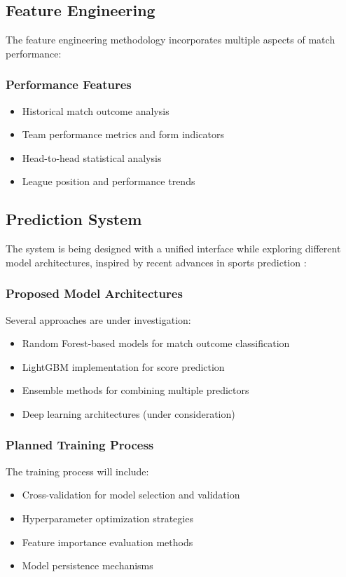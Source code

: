 \documentclass[conference]{IEEEtran}
\begin{document}
\subsection{Feature Engineering}
The feature engineering methodology incorporates multiple aspects of match performance:

\subsubsection{Performance Features}
\begin{itemize}
\item Historical match outcome analysis
\item Team performance metrics and form indicators
\item Head-to-head statistical analysis
\item League position and performance trends
\end{itemize}

\subsection{Prediction System}
The system is being designed with a unified interface while exploring different model architectures, inspired by recent advances in sports prediction \cite{constantinou2019dolores}:

\subsubsection{Proposed Model Architectures}
Several approaches are under investigation:
\begin{itemize}
\item Random Forest-based models for match outcome classification
\item LightGBM implementation for score prediction
\item Ensemble methods for combining multiple predictors
\item Deep learning architectures (under consideration)
\end{itemize}

\subsubsection{Planned Training Process}
The training process will include:
\begin{itemize}
\item Cross-validation for model selection and validation
\item Hyperparameter optimization strategies
\item Feature importance evaluation methods
\item Model persistence mechanisms
\end{itemize}
\end{document}
